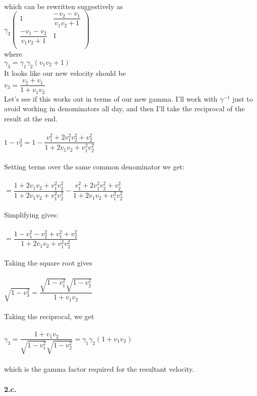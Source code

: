 \documentclass[prb,preprint]
{revtex4-1}
\newcommand{\PRLsep}{\noindent\makebox[\linewidth]{\resizebox{0.8888\linewidth}{2pt}{$\bullet$}}\bigskip}
\begin{document}
\\
which can be rewritten suggestively as
\\
$\gamma_3 
\begin{pmatrix}
1 & \dfrac{-v_2 - v_1}{v_1 v_2 + 1}\\
\dfrac{-v_1 - v_2}{v_1 v_2 + 1} & 1\\
\end{pmatrix} $
\\
where 
\\
$\gamma_3 = \gamma_1 \gamma_2 \left(v_1 v_2 + 1\right)$
\\
It looks like our new velocity should be 
\\
$v_3 = \dfrac{v_2 + v_1}{1 + v_1 v_2}$
\\
Let's see if this works out in terms of our new gamma.  I'll work with $\gamma^{-1}$ just to avoid working in denominators all day, and then I'll take the reciprocal of the result at the end.
\\
\\
$1 - v_3^2 = 1 - \dfrac{v_1^2 + 2v_1^2 v_2^2 + v_2^2}{1 + 2 v_1 v_2 + v_1^2 v_2^2}$
\\
\\
Setting terms over the same common denominator we get:
\\
\\
$= \dfrac{1 + 2 v_1 v_2 + v_1^2 v_2^2}{1 + 2 v_1 v_2 + v_1^2 v_2^2} - \dfrac{v_1^2 + 2v_1^2 v_2^2 + v_2^2}{1 + 2 v_1 v_2 + v_1^2 v_2^2}$
\\
\\
Simplifying gives:
\\
\\
$= \dfrac{1 - v_1^2 - v_2^2 + v_1^2 + v_2^2}{1 + 2 v_1 v_2 + v_1^2 v_2^2}$
\\
\\
Taking the square root gives
\\
\\
$\sqrt{1 - v_3^2} = \dfrac{\sqrt{1-v_1^2}\sqrt{1-v_2^2}}{1+ v_1 v_2}$
\\
\\
Taking the reciprocal, we get 
\\
\\
$\gamma_3 = \dfrac{1+ v_1 v_2}{\sqrt{1-v_1^2}\sqrt{1-v_2^2}} = \gamma_1 \gamma_2 \left(1+ v_1 v_2\right)$
\\
\\
which is the gamma factor required for the resultant velocity.
\\
\PRLsep
\\
\textbf{2.c.}
\\
\end{document}
